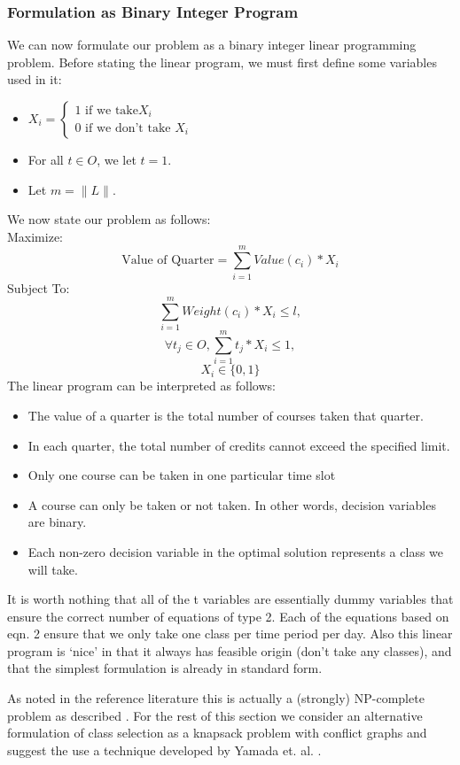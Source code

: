 \documentclass[11pt]{article} %
\begin{document}
\subsubsection{Formulation as Binary Integer Program} We can now formulate our
problem as a binary integer linear programming problem. Before stating the
linear program, we must first define some variables used in it: \\
\begin{itemize} \item $ X_i = \left\{ \begin{array}{lr} 1 \text{ if we take
} X_i\\ 0 \text{ if we don't take } X_i \end{array} \right. $ \item For all $t
\in O$, we let $t = 1$.  \item Let $m = \|L\|$.  \end{itemize} We now state our
problem as follows:\\ Maximize: $$ \text{Value of Quarter} = \sum_{i=1}^m
Value(c_i) * X_i $$ Subject To: $$ \sum_{i=1}^m Weight(c_i) * X_i \leq l, $$ $$
\forall t_j \in O, \sum_{i=1}^m t_j * X_i \leq 1, $$ $$ X_i \in \{0, 1\} $$ The
linear program can be interpreted as follows: \begin{itemize} \item The value of
a quarter is the total number of courses taken that quarter.  \item In each
quarter, the total number of credits cannot exceed the specified limit.  \item
Only one course can be taken in one particular time slot \item A course can only
be taken or not taken. In other words, decision variables are binary.  \item
Each non-zero decision variable in the optimal solution represents a class we
will take.  \end{itemize}

It is worth nothing that all of the t variables are essentially dummy variables
that ensure the correct number of equations of type 2. Each of the equations
based on eqn. 2 ensure that we only take one class per time period per day. Also
this linear program is ‘nice’ in that it always has feasible origin (don’t take
any classes), and that the simplest formulation is already in standard form.

As noted in the reference literature this is actually a (strongly) NP-complete
problem as described \cite{pferschy:kcg}. For the rest of this section we
consider an alternative formulation of class selection as a knapsack problem
with conflict graphs and suggest the use a technique developed by Yamada et. al.
\cite{yamada:heuristic}.
\end{document}
